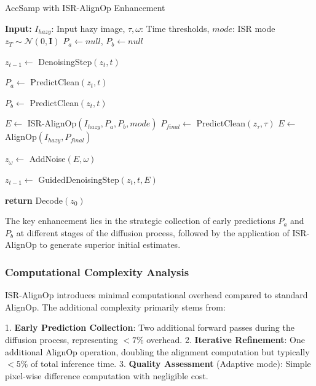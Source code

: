 \documentclass{article}
\begin{document}
\begin{algorithm}[tb]
\caption{AccSamp with ISR-AlignOp Enhancement}
\label{alg:isr_accsamp}
\begin{algorithmic}[1]
\STATE \textbf{Input:} $I_{hazy}$: Input hazy image, $\tau, \omega$: Time thresholds, $mode$: ISR mode
\STATE $z_T \sim \mathcal{N}(0, \mathbf{I})$
\STATE $P_a \leftarrow null$, $P_b \leftarrow null$

    \STATE $z_{t-1} \leftarrow$ DenoisingStep$(z_t, t)$
    
        \STATE $P_a \leftarrow$ PredictClean$(z_t, t)$
    \ENDIF
    
        \STATE $P_b \leftarrow$ PredictClean$(z_t, t)$
    \ENDIF
\ENDFOR

    \STATE $E \leftarrow$ ISR-AlignOp$(I_{hazy}, P_a, P_b, mode)$
\ELSE
    \STATE $P_{final} \leftarrow$ PredictClean$(z_\tau, \tau)$
    \STATE $E \leftarrow$ AlignOp$(I_{hazy}, P_{final})$ 
\ENDIF

\STATE $z_\omega \leftarrow$ AddNoise$(E, \omega)$

    \STATE $z_{t-1} \leftarrow$ GuidedDenoisingStep$(z_t, t, E)$
\ENDFOR

\STATE \textbf{return} Decode$(z_0)$
\end{algorithmic}
\end{algorithm}

The key enhancement lies in the strategic collection of early predictions $P_a$ and $P_b$ at different stages of the diffusion process, followed by the application of ISR-AlignOp to generate superior initial estimates.

\subsubsection{Computational Complexity Analysis}

ISR-AlignOp introduces minimal computational overhead compared to standard AlignOp. The additional complexity primarily stems from:

1. \textbf{Early Prediction Collection}: Two additional forward passes during the diffusion process, representing $< 7\%$ overhead.
2. \textbf{Iterative Refinement}: One additional AlignOp operation, doubling the alignment computation but typically $< 5\%$ of total inference time.
3. \textbf{Quality Assessment} (Adaptive mode): Simple pixel-wise difference computation with negligible cost.
\end{document}
